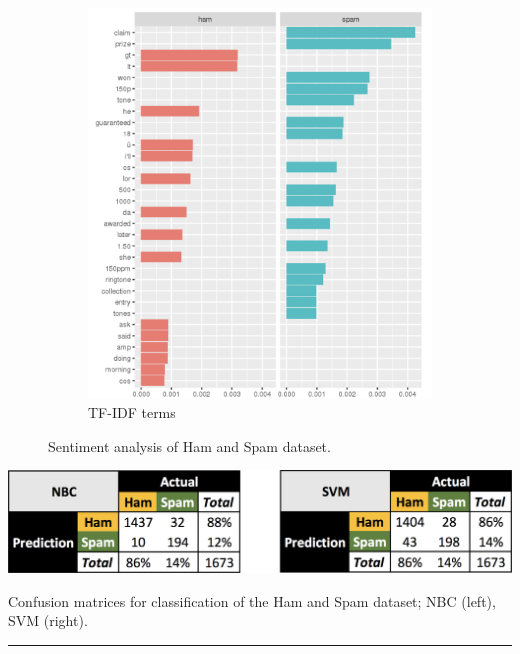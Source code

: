 \begin{figure}[!t]
\begin{subfigure}[c]{0.48\textwidth}
\end{subfigure}
\begin{subfigure}[c]{0.24\textwidth}
\includegraphics[width=\textwidth]{images/DSML/TMHS3.png}\caption{\small TF-IDF terms}
\end{subfigure}
\caption[\small Sentiment analysis of Ham and Spam dataset]{\small Sentiment analysis of Ham and Spam dataset.}\label{fig:hs}
\end{figure}
\begin{table}[!t]
\centering
\includegraphics[width=\textwidth]{images/DSML/TMHS4.png}\caption[\small Confusion matrices for classification of Ham and Spam dataset]{\small Confusion matrices for classification of the Ham and Spam dataset; NBC (left), SVM (right).}\hrule \label{tab:hs}
\end{table}
